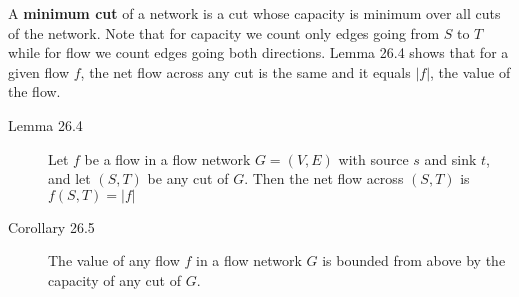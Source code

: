 A \textbf{minimum cut} of a network is a cut whose capacity is minimum over all
cuts of the network. Note that for capacity we count only edges going from $S$
to $T$ while for flow we count edges going both directions.  Lemma 26.4 shows
that for a given flow $f$, the net flow across any cut is the same and it equals
$|f|$, the value of the flow.

\begin{description}
\item[Lemma 26.4] Let $f$ be a flow in a flow network $G = (V,E)$ with source
  $s$ and sink $t$, and let $(S,T)$ be any cut of $G$. Then the net flow across
  $(S,T)$ is $f(S,T) = |f|$

\item[Corollary 26.5] The value of any flow $f$ in a flow network $G$ is bounded
  from above by the capacity of any cut of $G$.
\end{description}

